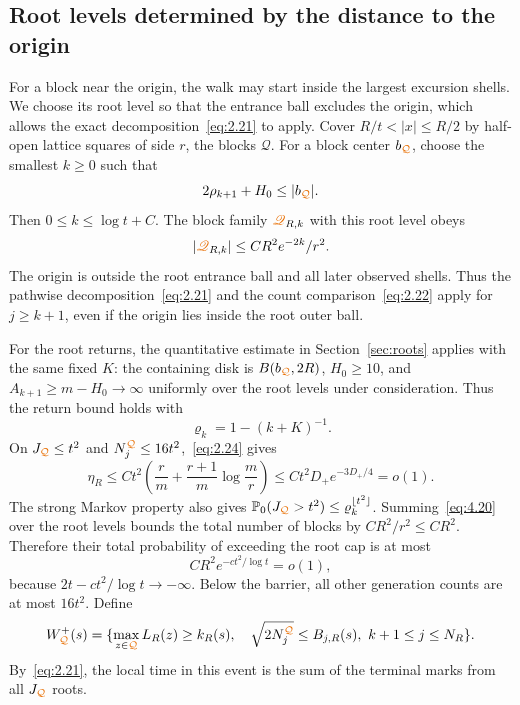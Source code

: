 \documentclass[11pt,letterpaper,reqno]{amsart}
\newif\ifrevmarks \revmarkstrue
\newcommand{\add}[1]{\ifrevmarks\textcolor{revorange}{#1}\else#1\fi}
\newcommand{\ren}[2]{\add{#2}}%
\numberwithin{equation}{section}
\theoremstyle{remark}
\begin{document}
\subsection{Root levels determined by the distance to the origin}\label{sec:rootlevels}
For a block near the origin, the walk may start inside the largest excursion shells. We choose its root level so that the entrance ball excludes the origin, which allows the exact decomposition~\eqref{eq:2.21} to apply. Cover $R/t<|x|\le R/2$ by half-open lattice squares of side $r$\add{, the blocks $\mathcal Q$}. For a block center $b_{\ren{C}{\mathcal Q}}$, choose the smallest $k\ge0$ such that
\begin{equation}\label{eq:4.19}
2\rho_{k+1}+H_0\le|b_{\ren{C}{\mathcal Q}}|.
\end{equation}
Then $0\le k\le\log t+C$. The block family $\ren{\mathscr C}{\mathscr Q}_{R,k}$ with this root level obeys
\begin{equation}\label{eq:4.20}
|\ren{\mathscr C}{\mathscr Q}_{R,k}|\le C R^2e^{-2k}/r^2.
\end{equation}
The origin is outside the root entrance ball and all later observed shells. Thus the pathwise decomposition~\eqref{eq:2.21} and the count comparison~\eqref{eq:2.22} apply for $j\ge k+1$, even if the origin lies inside the root outer ball.

For the root returns, the quantitative estimate in Section~\ref{sec:roots} applies with the same fixed $K$: the containing disk is $B(b_{\ren{C}{\mathcal Q}},2R)$, $H_0\ge10$, and $A_{k+1}\ge m-H_0\to\infty$ uniformly over the root levels under consideration. Thus the return bound holds with
\begin{equation}\label{eq:4.21}
\varrho_k=1-(k+K)^{-1}.
\end{equation}
On $J_{\ren{C}{\mathcal Q}}\le t^2$ and $N_j^{\ren{C}{\mathcal Q}}\le16t^2$,~\eqref{eq:2.24} gives
\begin{equation}\label{eq:4.22}
\eta_R\le Ct^2\left(\frac rm+\frac{r+1}m\log\frac mr\right)
\le Ct^2D_+e^{-3D_+/4}=o(1).
\end{equation}
The strong Markov property also gives
$\mathbb P_0(J_{\ren{C}{\mathcal Q}}>t^2)\le\varrho_k^{\lfloor t^2\rfloor}$.
Summing~\eqref{eq:4.20} over the root levels bounds the total number of blocks by $CR^2/r^2\le CR^2$. Therefore their total probability of exceeding the root cap is at most
\begin{equation}\label{eq:4.23}
CR^2e^{-ct^2/\log t}=o(1),
\end{equation}
because $2t-ct^2/\log t\to-\infty$.
Below the barrier, all other generation counts are at most $16t^2$. Define
\begin{equation}\label{eq:4.24}
W_{\ren{C}{\mathcal Q}}^+(s)=\{\max_{z\in\ren{{C}}{\mathcal Q}}L_R(z)\ge k_R(s),\quad
\sqrt{2N_j^{\ren{C}{\mathcal Q}}}\le B_{j,R}(s),\ k+1\le j\le N_R\}.
\end{equation}
By~\eqref{eq:2.21}, the local time in this event is the sum of the terminal marks from all $J_{\ren{C}{\mathcal Q}}$ roots.
\end{document}
